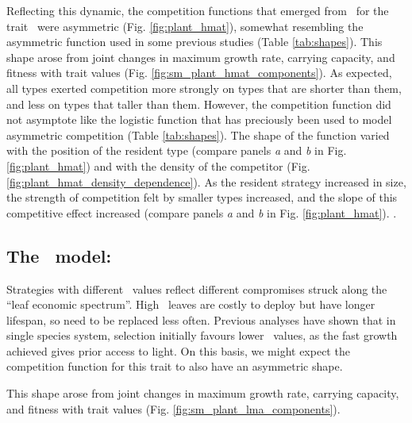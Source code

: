 \documentclass[a4paper,11pt]{article}
\newcommand{\todo}[1]{{\color{navy}{(todo: #1)}}}
\begin{document}
Reflecting this dynamic, the competition functions that emerged from \plant\ for the trait \hmat\ were asymmetric (Fig. \ref{fig:plant_hmat}), somewhat resembling the asymmetric function used in some previous studies \citep{Law-1997, Kisdi-1999, Geritz-1999, Egas-2004, Calcagno-2006, DAndrea-2013} (Table \ref{tab:shapes}). This shape arose from joint changes in maximum growth rate, carrying capacity, and fitness with trait values (Fig. \ref{fig:sm_plant_hmat_components}). As expected, all types exerted competition more strongly on types that are shorter than them, and less on types that taller than them.  However, the competition function did not asymptote like the logistic function that has preciously been used to model asymmetric competition (Table \ref{tab:shapes}). The shape of the function varied with the position  of the resident type (compare panels \textit{a} and \textit{b} in Fig. \ref{fig:plant_hmat}) and with the density of the competitor (Fig. \ref{fig:plant_hmat_density_dependence}). As the resident strategy increased in size, the strength of competition felt by smaller types increased, and the slope of this competitive effect increased (compare panels \textit{a} and \textit{b} in Fig. \ref{fig:plant_hmat}).  \todo{expand on changes with density}.

\subsection{The \plant\ model: \lma}

Strategies with different \lma\ values reflect different compromises struck along the ``leaf economic spectrum''\citep{Reich-1997,Wright-2004}. High \lma\ leaves are costly to deploy but have longer lifespan, so need to be replaced less often. Previous analyses have shown that in single species system, selection initially favours lower \lma\ values, as the fast growth achieved gives prior access to light. On this basis, we might expect the competition function for this trait to also have an asymmetric shape.

This shape arose from joint changes in maximum growth rate, carrying capacity, and fitness with trait values (Fig. \ref{fig:sm_plant_lma_components}).
\end{document}
